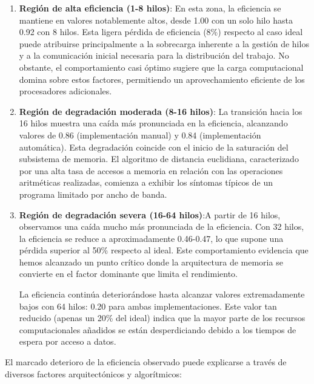         \begin{enumerate}

            \item \textbf{Región de alta eficiencia (1-8 hilos)}: En esta zona, la eficiencia se mantiene en valores notablemente altos, desde 1.00 con un solo hilo hasta 0.92 con 8 hilos. Esta ligera pérdida de eficiencia (8\%) respecto al caso ideal puede atribuirse principalmente a la sobrecarga inherente a la gestión de hilos y a la comunicación inicial necesaria para la distribución del trabajo. No obstante, el comportamiento casi óptimo sugiere que la carga computacional domina sobre estos factores, permitiendo un aprovechamiento eficiente de los procesadores adicionales.

            \item \textbf{Región de degradación moderada (8-16 hilos)}: La transición hacia los 16 hilos muestra una caída más pronunciada en la eficiencia, alcanzando valores de 0.86 (implementación manual) y 0.84 (implementación automática). Esta degradación coincide con el inicio de la saturación del subsistema de memoria. El algoritmo de distancia euclidiana, caracterizado por una alta tasa de accesos a memoria en relación con las operaciones aritméticas realizadas, comienza a exhibir los síntomas típicos de un programa limitado por ancho de banda.

            \item \textbf{Región de degradación severa (16-64 hilos)}:A partir de 16 hilos, observamos una caída mucho más pronunciada de la eficiencia. Con 32 hilos, la eficiencia se reduce a aproximadamente 0.46-0.47, lo que supone una pérdida superior al 50\% respecto al ideal. Este comportamiento evidencia que hemos alcanzado un punto crítico donde la arquitectura de memoria se convierte en el factor dominante que limita el rendimiento.
            
            La eficiencia continúa deteriorándose hasta alcanzar valores extremadamente bajos con 64 hilos: 0.20 para ambas implementaciones. Este valor tan reducido (apenas un 20\% del ideal) indica que la mayor parte de los recursos computacionales añadidos se están desperdiciando debido a los tiempos de espera por acceso a datos.

        \end{enumerate}

        El marcado deterioro de la eficiencia observado puede explicarse a través de diversos factores arquitectónicos y algorítmicos:

